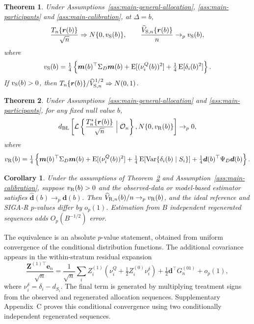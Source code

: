 \documentclass[12pt,a4paper]{article}
\newtheorem{theorem}{Theorem}
\newtheorem{corollary}{Corollary}
\theoremstyle{definition}
\newcommand{\E}{\operatorname E}
\newcommand{\Var}{\operatorname{Var}}
\begin{document}
\begin{theorem}\label{thm:main-sampling}
Under Assumptions~\ref{ass:main-general-allocation}, \ref{ass:main-participants} and \ref{ass:main-calibration}, at $\Delta=b$,
\begin{equation}\label{eq:vS-main}
 \frac{T_n\{\bm r(b)\}}{\sqrt n}\Rightarrow N\{0,v_{\rm S}(b)\},\qquad
 \frac{\widehat V_{{\rm S},n}\{\bm r(b)\}}n\to_p v_{\rm S}(b),
\end{equation}
where
\[
 v_{\rm S}(b)=\tfrac14\left\{\bm m(b)^\top\Sigma_D\bm m(b)+
 \E[(\nu_i^Q(b))^2]+\tfrac14\E[\delta_i(b)^2]\right\}.
\]
If $v_{\rm S}(b)>0$, then $T_n\{\bm r(b)\}/\widehat V_{{\rm S},n}^{1/2}\Rightarrow N(0,1)$.
\end{theorem}

\begin{theorem}\label{thm:main-randomization}
Under Assumptions~\ref{ass:main-general-allocation} and \ref{ass:main-participants}, for any fixed null value $b$,
\begin{equation}\label{eq:conditional-main}
 d_{\rm BL}\left[\mathcal L\left\{\frac{T_n^*\{\bm r(b)\}}{\sqrt n}
                  \mathrel{\Big|}\mathcal O_n\right\},N\{0,v_{\rm R}(b)\}\right]\to_p0,
\end{equation}
where
\begin{equation}\label{eq:vR-main}
 v_{\rm R}(b)=\tfrac14\left\{\bm m(b)^\top\Sigma_D\bm m(b)+\E[(\nu_i^Q(b))^2]
 +\tfrac14\E[\Var\{\delta_i(b)\mid S_i\}]+\tfrac14\bm d(b)^\top\Psi_D\bm d(b)\right\}.
\end{equation}
\end{theorem}

\begin{corollary}\label{cor:main-randomization-estimator}
Under the assumptions of Theorem~\ref{thm:main-randomization} and Assumption~\ref{ass:main-calibration}, suppose $v_{\rm R}(b)>0$ and the observed-data or model-based estimator satisfies $\widehat{\bm d}(b)\to_p\bm d(b)$. Then $\widehat V_{{\rm R},n}(b)/n\to_pv_{\rm R}(b)$, and the ideal reference and SIGA-R $p$-values differ by $o_p(1)$. Estimation from $B$ independent regenerated sequences adds $O_p(B^{-1/2})$ error.
\end{corollary}

The equivalence is an absolute $p$-value statement, obtained from uniform convergence of the conditional distribution functions. The additional covariance appears in the within-stratum residual expansion
\begin{equation}\label{eq:pair-expansion}
 \frac{\bm Z^{(1)\top}\bm e_n}{\sqrt n}
 =\frac1{\sqrt n}\sum_iZ_i^{(1)}
       (\nu_i^Q+\tfrac12Z_i^{(0)}\nu_i^\delta)
       +\tfrac12\bm d^\top G_n^{(01)}+o_p(1),
\end{equation}
where $\nu_i^\delta=\delta_i-d_{S_i}$. The final term is generated by multiplying treatment signs from the observed and regenerated allocation sequences. Supplementary Appendix~C proves this conditional convergence using two conditionally independent regenerated sequences.
\end{document}
